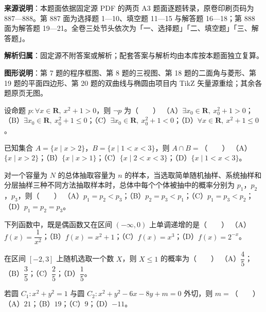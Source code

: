 \begin{gknotice}
\textbf{来源说明}：本题面依据固定源 PDF 的两页 A3 题面逐题转录，原卷印刷页码为 887—888。第 887 面为选择题 1—10、填空题 11—15 与解答题 16—18；第 888 面为解答题 19—21。全卷三处节头依次为「一、选择题」「二、填空题」「三、解答题」。

\textbf{解析归属}：固定源不附答案或解析；配套答案与解析均由本库按本题面独立复算。

\textbf{图形说明}：第 7 题的程序框图、第 8 题的三视图、第 18 题的二面角与菱形、第 19 题的平面四边形、第 20 题的双曲线与椭圆由项目内 TikZ 矢量源重绘；其余各题原页无图。
\end{gknotice}
\begin{question}
设命题 $p:\forall x\in\mathbf R,\ x^2+1>0$，则 $\neg p$ 为\mbox{（　　）}
（A）$\exists x_0\in\mathbf R,\ x_0^2+1>0$；（B）$\exists x_0\in\mathbf R,\ x_0^2+1\leqslant0$；（C）$\exists x_0\in\mathbf R,\ x_0^2+1<0$；（D）$\forall x\in\mathbf R,\ x^2+1\leqslant0$。
\end{question}
\begin{question}
已知集合 $A=\{x\mid x>2\}$，$B=\{x\mid1<x<3\}$，则 $A\cap B=$\mbox{（　　）}
（A）$\{x\mid x>2\}$；（B）$\{x\mid x>1\}$；（C）$\{x\mid2<x<3\}$；（D）$\{x\mid1<x<3\}$。
\end{question}
\begin{question}
对一个容量为 $N$ 的总体抽取容量为 $n$ 的样本，当选取简单随机抽样、系统抽样和分层抽样三种不同方法抽取样本时，总体中每个个体被抽中的概率分别为 $p_1$，$p_2$，$p_3$，则\mbox{（　　）}
（A）$p_1=p_2<p_3$；（B）$p_2=p_3<p_1$；（C）$p_1=p_3<p_2$；（D）$p_1=p_2=p_3$。
\end{question}
\begin{question}
下列函数中，既是偶函数又在区间 $(-\infty,0)$ 上单调递增的是\mbox{（　　）}
（A）$f(x)=\dfrac1{x^2}$；（B）$f(x)=x^2+1$；（C）$f(x)=x^3$；（D）$f(x)=2^{-x}$。
\end{question}
\begin{question}
在区间 $[-2,3]$ 上随机选取一个数 $X$，则 $X\leqslant1$ 的概率为\mbox{（　　）}
（A）$\dfrac45$；（B）$\dfrac35$；（C）$\dfrac25$；（D）$\dfrac15$。
\end{question}
\begin{question}
若圆 $C_1:x^2+y^2=1$ 与圆 $C_2:x^2+y^2-6x-8y+m=0$ 外切，则 $m=$\mbox{（　　）}
（A）$21$；（B）$19$；（C）$9$；（D）$-11$。
\Needspace{0.4\textheight}
\end{question}
